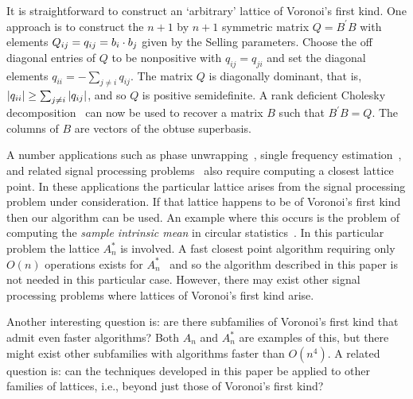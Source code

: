 \documentclass[final,leqno]{siamltex}
\begin{document}
It is straightforward to construct an `arbitrary' lattice of Voronoi's first kind.  One approach is to construct the $n+1$ by $n+1$ symmetric matrix $Q = B^\prime B$ with elements $Q_{ij} = q_{ij} = b_{i} \cdot b_j$ given by the Selling parameters.  Choose the off diagonal entries of $Q$ to be nonpositive with $q_{ij}=q_{ji}$ and set the diagonal elements $q_{ii} = -\sum_{j \neq i} q_{ij}$.  %
The matrix $Q$ is diagonally dominant, that is, ${\left| q_{ii} \right|} \geq \sum_{j \neq i} {\left| q_{ij} \right|}$, and so $Q$ is positive semidefinite.  A rank deficient Cholesky decomposition~\cite{Higham90analysisof} can now be used to recover a matrix $B$ such that $B^\prime B  = Q$. The columns of $B$ are vectors of the obtuse superbasis.

A number applications such as phase unwrapping~\cite{Teunissen_GPS_1995,Hassibi_GPS_1998}, single frequency estimation~\cite{McKilliamFrequencyEstimationByPhaseUnwrapping2009}, and related signal processing problems~\cite{McKilliam2007,Clarkson2007,McKilliam2009IndentifiabliltyAliasingPolyphase,Quinn_sparse_noisy_SSP_2012} also require computing a closest lattice point.  In these applications the particular lattice arises from the signal processing problem under consideration.  If that lattice happens to be of Voronoi's first kind then our algorithm can be used.  An example where this occurs is the problem of computing the \emph{sample intrinsic mean} in circular statistics~\cite{McKilliam_mean_dir_est_sq_arc_length2010}.  In this particular problem the lattice $A_n^*$ is involved.  A fast closest point algorithm requiring only $O(n)$ operations exists for $A_n^*$~\cite{McKilliam2009CoxeterLattices,McKilliam2008b} and so the algorithm described in this paper is not needed in this particular case.  However, there may exist other signal processing problems where lattices of Voronoi's first kind arise.

Another interesting question is: are there subfamilies of Voronoi's first kind that admit even faster algorithms?  Both $A_n$ and $A_n^*$ are examples of this, but there might exist other subfamilies with algorithms faster than $O(n^4)$.  A related question is: can the techniques developed in this paper be applied to other families of lattices, i.e., beyond just those of Voronoi's first kind?  %
\end{document}
